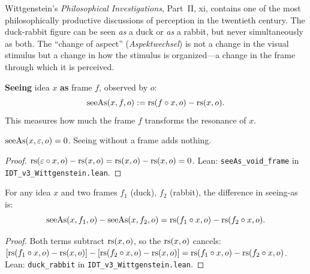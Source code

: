 Wittgenstein's \textit{Philosophical Investigations}, Part~II, xi, contains
one of the most philosophically productive discussions of perception in the
twentieth century. The duck-rabbit figure can be seen \emph{as} a duck or
\emph{as} a rabbit, but never simultaneously as both. The ``change of aspect''
(\textit{Aspektwechsel}) is not a change in the visual stimulus but a change
in how the stimulus is organized---a change in the frame through which it
is perceived.

\begin{definition}[Seeing-As]
\label{def:seeing-as}
\textbf{Seeing} idea $x$ \textbf{as} frame $f$, observed by $o$:
\[
\mathrm{seeAs}(x, f, o) := \mathrm{rs}(f \circ x, o) - \mathrm{rs}(x, o).
\]
This measures how much the frame $f$ transforms the resonance of $x$.
\end{definition}

\begin{theorem}
\label{thm:void-frame}
$\mathrm{seeAs}(x, \varepsilon, o) = 0$. Seeing without a frame adds nothing.
\end{theorem}

\begin{proof}
$\mathrm{rs}(\varepsilon \circ x, o) - \mathrm{rs}(x, o) = \mathrm{rs}(x, o) - \mathrm{rs}(x, o) = 0$.
Lean: \texttt{seeAs\_void\_frame} in \texttt{IDT\_v3\_Wittgenstein.lean}.
\end{proof}

\begin{theorem}
\label{thm:duck-rabbit}
For any idea $x$ and two frames $f_1$ (duck), $f_2$ (rabbit), the
difference in seeing-as is:
\[
\mathrm{seeAs}(x, f_1, o) - \mathrm{seeAs}(x, f_2, o)
= \mathrm{rs}(f_1 \circ x, o) - \mathrm{rs}(f_2 \circ x, o).
\]
\end{theorem}

\begin{proof}
Both terms subtract $\mathrm{rs}(x, o)$, so the $\mathrm{rs}(x, o)$ cancels:
$[\mathrm{rs}(f_1 \circ x, o) - \mathrm{rs}(x,o)] - [\mathrm{rs}(f_2 \circ x, o) - \mathrm{rs}(x,o)]
= \mathrm{rs}(f_1 \circ x, o) - \mathrm{rs}(f_2 \circ x, o)$.
Lean: \texttt{duck\_rabbit} in \texttt{IDT\_v3\_Wittgenstein.lean}.
\end{proof}

